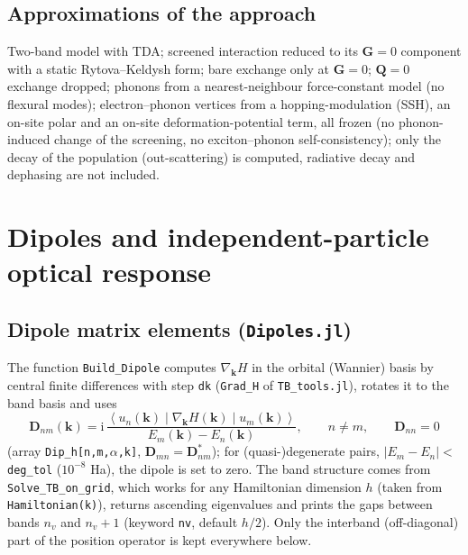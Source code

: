 \documentclass[11pt,a4paper]{article}
\newcommand{\ii}{\mathrm{i}}
\newcommand{\kk}{\bm{k}}
\newcommand{\GG}{\bm{G}}
\newcommand{\mel}[3]{\left\langle#1\middle|#2\middle|#3\right\rangle}
\newcommand{\code}[1]{\texttt{#1}}
\begin{document}
\subsection{Approximations of the approach}
Two-band model with TDA; screened interaction reduced to its $\GG=0$ component with a static Rytova--Keldysh form; bare exchange only at $\GG=0$; $\bm Q=0$ exchange dropped; phonons from a nearest-neighbour force-constant model (no flexural modes); electron--phonon vertices from a hopping-modulation (SSH), an on-site polar and an on-site deformation-potential term, all frozen (no phonon-induced change of the screening, no exciton--phonon self-consistency); only the decay of the population (out-scattering) is computed, radiative decay and dephasing are not included.

\section{Dipoles and independent-particle optical response}
\label{sec:optics}

\subsection{Dipole matrix elements (\code{Dipoles.jl})}
The function \code{Build\_Dipole} computes $\nabla_{\kk}H$ in the orbital (Wannier) basis by central finite differences with step \code{dk}
(\code{Grad\_H} of \code{TB\_tools.jl}), rotates it to the band basis and uses
\begin{equation}
\boxed{\,\bm D_{nm}(\kk)=\ii\,\frac{\mel{u_n(\kk)}{\nabla_{\kk}H(\kk)}{u_m(\kk)}}{E_m(\kk)-E_n(\kk)},\qquad n\neq m,\qquad \bm D_{nn}=0\,}
\label{eq:dip}
\end{equation}
(array \code{Dip\_h[n,m,$\alpha$,k]}, $\bm D_{mn}=\bm D_{nm}^*$); for (quasi-)degenerate pairs, $|E_m-E_n|<$ \code{deg\_tol} ($10^{-8}$ Ha), the dipole is set to zero.
The band structure comes from \code{Solve\_TB\_on\_grid}, which works for any Hamiltonian dimension $h$ (taken from \code{Hamiltonian(k)}),
returns ascending eigenvalues and prints the gaps between bands $n_v$ and $n_v+1$ (keyword \code{nv}, default $h/2$). Only the interband (off-diagonal) part of the position operator is kept everywhere below.
\end{document}
